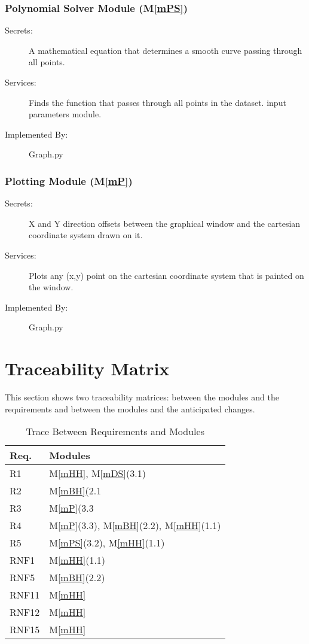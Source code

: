 \documentclass[12pt, titlepage]{article}
\newcommand{\mref}[1]{M\ref{#1}}
\begin{document}
\subsubsection{Polynomial Solver Module (\mref{mPS})}
\begin{description}
\item[Secrets:]A mathematical equation that determines a smooth curve passing through all points.
\item[Services:]Finds the function that passes through all points in the dataset. 
  input parameters module.
\item[Implemented By:] Graph.py
\end{description}

\subsubsection{Plotting Module (\mref{mP})}
\begin{description}
\item[Secrets:] X and Y direction offsets between the graphical window and the cartesian coordinate system drawn on it.
\item[Services:]Plots any (x,y) point on the cartesian coordinate system that is painted on the window. 
\item[Implemented By:] Graph.py
\end{description}

\section{Traceability Matrix} \label{SecTM}%

This section shows two traceability matrices: between the modules and the
requirements and between the modules and the anticipated changes.

\begin{table}[H]
\centering
\begin{tabular}{p{} p{}}
\toprule
\textbf{Req.} & \textbf{Modules}\\
\midrule
R1 & \mref{mHH}, \mref{mDS}(3.1) \\
R2 & \mref{mBH}(2.1 \\
R3 & \mref{mP}(3.3\\
R4 & \mref{mP}(3.3), \mref{mBH}(2.2), \mref{mHH}(1.1)\\
R5 & \mref{mPS}(3.2), \mref{mHH}(1.1) \\
RNF1 & \mref{mHH}(1.1) \\
RNF5 & \mref{mBH}(2.2) \\
RNF11 & \mref{mHH}\\
RNF12 & \mref{mHH}\\
RNF15 & \mref{mHH}\\
\bottomrule
\end{tabular}
\caption{Trace Between Requirements and Modules}
\label{TblRT}
\end{table}
\end{document}
